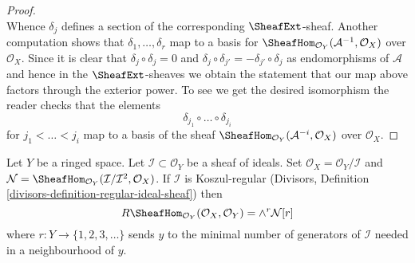 \begin{proof}
$$$$
Whence $\delta_j$ defines a section of the corresponding
$\SheafExt$-sheaf.
Another computation shows that $\delta_1, \ldots, \delta_r$
map to a basis for $\SheafHom_{\mathcal{O}_Y}(\mathcal{A}^{-1}, \mathcal{O}_X)$
over $\mathcal{O}_X$.
Since it is clear that $\delta_j \circ \delta_j = 0$
and $\delta_j \circ \delta_{j'} = - \delta_{j'} \circ \delta_j$
as endomorphisms of $\mathcal{A}$ and hence in the
$\SheafExt$-sheaves
we obtain the statement that our map above factors through
the exterior power. To see we get the desired isomorphism
the reader checks that the elements
$$
\delta_{j_1} \circ \ldots \circ \delta_{j_i}
$$
for $j_1 < \ldots < j_i$ map to a basis of the sheaf
$\SheafHom_{\mathcal{O}_Y}(\mathcal{A}^{-i}, \mathcal{O}_X)$
over $\mathcal{O}_X$.
\end{proof}

\begin{lemma}
\label{lemma-regular-immersion-ext}
Let $Y$ be a ringed space. Let $\mathcal{I} \subset \mathcal{O}_Y$
be a sheaf of ideals. Set $\mathcal{O}_X = \mathcal{O}_Y/\mathcal{I}$ and
$\mathcal{N} =
\SheafHom_{\mathcal{O}_Y}(\mathcal{I}/\mathcal{I}^2, \mathcal{O}_X)$.
If $\mathcal{I}$ is Koszul-regular
(Divisors, Definition \ref{divisors-definition-regular-ideal-sheaf}) then
$$
R\SheafHom_{\mathcal{O}_Y}(\mathcal{O}_X, \mathcal{O}_Y) =
\wedge^r \mathcal{N}[r]
$$
where $r : Y \to \{1, 2, 3, \ldots \}$ sends $y$ to
the minimal number of generators of $\mathcal{I}$ needed in a neighbourhood
of $y$.
\end{lemma}

